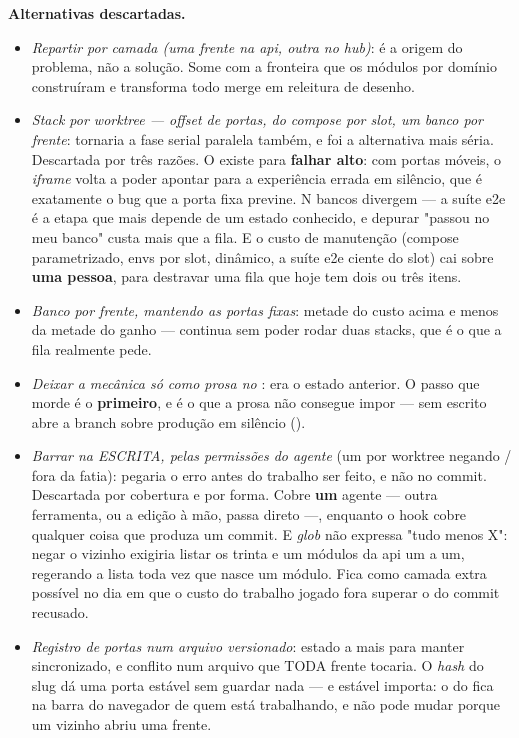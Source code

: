 \textbf{Alternativas descartadas.}
\begin{itemize}
  \item \emph{Repartir por camada (uma frente na api, outra no hub)}: é a origem
    do problema, não a solução. Some com a fronteira que os módulos por domínio
    construíram e transforma todo merge em releitura de desenho.
  \item \emph{Stack por worktree --- offset de portas,  do compose por
    slot, um banco por frente}: tornaria a fase serial paralela também, e foi a
    alternativa mais séria. Descartada por três razões. O  existe
    para \textbf{falhar alto}: com portas móveis, o \emph{iframe} volta a poder
    apontar para a experiência errada em silêncio, que é exatamente o bug que a
    porta fixa previne. N bancos divergem --- a suíte e2e é a etapa que mais
    depende de um estado conhecido, e depurar "passou no meu banco" custa mais
    que a fila. E o custo de manutenção (compose parametrizado, envs por slot,
     dinâmico, a suíte e2e ciente do slot) cai sobre
    \textbf{uma pessoa}, para destravar uma fila que hoje tem dois ou três itens.
  \item \emph{Banco por frente, mantendo as portas fixas}: metade do custo acima
    e menos da metade do ganho --- continua sem poder rodar duas stacks, que é o
    que a fila realmente pede.
  \item \emph{Deixar a mecânica só como prosa no }: era o
    estado anterior. O passo que morde é o \textbf{primeiro}, e é o que a prosa
    não consegue impor ---  sem  escrito abre
    a branch sobre produção em silêncio ().
  \item \emph{Barrar na ESCRITA, pelas permissões do agente} (um
     por worktree negando /
    fora da fatia): pegaria o erro antes do trabalho ser feito, e não no commit.
    Descartada por cobertura e por forma. Cobre \textbf{um} agente --- outra
    ferramenta, ou a edição à mão, passa direto ---, enquanto o hook cobre
    qualquer coisa que produza um commit. E \emph{glob} não expressa "tudo menos
    X": negar o vizinho exigiria listar os trinta e um módulos da api um a um,
    regerando a lista toda vez que nasce um módulo. Fica como camada extra
    possível no dia em que o custo do trabalho jogado fora superar o do commit
    recusado.
  \item \emph{Registro de portas num arquivo versionado}: estado a mais para
    manter sincronizado, e conflito num arquivo que TODA frente tocaria. O
    \emph{hash} do slug dá uma porta estável sem guardar nada --- e estável
    importa: o  do  fica na barra do navegador de quem
    está trabalhando, e não pode mudar porque um vizinho abriu uma frente.
\end{itemize}

